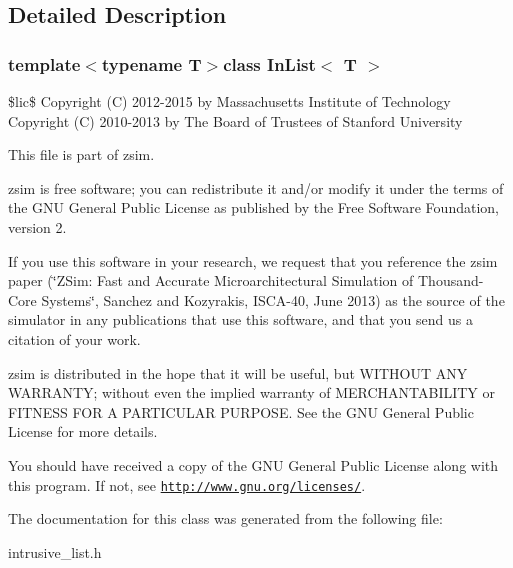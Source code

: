 \subsection{Detailed Description}
\subsubsection*{template$<$typename T$>$class In\-List$<$ T $>$}

\$lic\$ Copyright (C) 2012-\/2015 by Massachusetts Institute of Technology Copyright (C) 2010-\/2013 by The Board of Trustees of Stanford University

This file is part of zsim.

zsim is free software; you can redistribute it and/or modify it under the terms of the G\-N\-U General Public License as published by the Free Software Foundation, version 2.

If you use this software in your research, we request that you reference the zsim paper (\char`\"{}\-Z\-Sim\-: Fast and Accurate Microarchitectural Simulation of
\-Thousand-\/\-Core Systems\char`\"{}, Sanchez and Kozyrakis, I\-S\-C\-A-\/40, June 2013) as the source of the simulator in any publications that use this software, and that you send us a citation of your work.

zsim is distributed in the hope that it will be useful, but W\-I\-T\-H\-O\-U\-T A\-N\-Y W\-A\-R\-R\-A\-N\-T\-Y; without even the implied warranty of M\-E\-R\-C\-H\-A\-N\-T\-A\-B\-I\-L\-I\-T\-Y or F\-I\-T\-N\-E\-S\-S F\-O\-R A P\-A\-R\-T\-I\-C\-U\-L\-A\-R P\-U\-R\-P\-O\-S\-E. See the G\-N\-U General Public License for more details.

You should have received a copy of the G\-N\-U General Public License along with this program. If not, see \href{http://www.gnu.org/licenses/}{\tt http\-://www.\-gnu.\-org/licenses/}. 

The documentation for this class was generated from the following file\-:\begin{DoxyCompactItemize}
\item 
intrusive\-\_\-list.\-h\end{DoxyCompactItemize}
